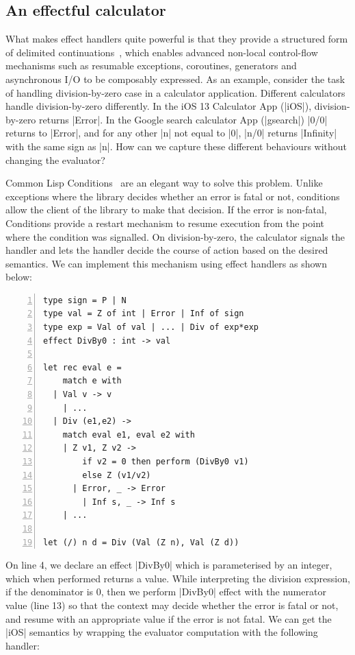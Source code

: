 \documentclass[sigplan,10pt,review,anonymous]{acmart}\settopmatter{printfolios=true,printccs=false,printacmref=false}
\begin{document}
\subsection{An effectful calculator}

What makes effect handlers quite powerful is that they provide a structured
form of delimited continuations~\cite{}, which enables advanced non-local
control-flow mechanisms such as resumable exceptions, coroutines, generators
and asynchronous I/O to be composably expressed. As an example, consider the
task of handling division-by-zero case in a calculator application. Different
calculators handle division-by-zero differently. In the iOS 13 Calculator App
(|iOS|), division-by-zero returns |Error|. In the Google search calculator App
(|gsearch|) |0/0| returns to |Error|, and for any other |n| not equal to |0|,
|n/0| returns |Infinity| with the same sign as |n|. How can we capture these
different behaviours without changing the evaluator?

Common Lisp Conditions~\cite{Conditions} are an elegant way to solve this
problem. Unlike exceptions where the library decides whether an error is fatal
or not, conditions allow the client of the library to make that decision. If
the error is non-fatal, Conditions provide a restart mechanism to
resume execution from the point where the condition was signalled. On
division-by-zero, the calculator signals the handler and lets the handler
decide the course of action based on the desired semantics. We can implement
this mechanism using effect handlers as shown below:

\begin{lstlisting}[numbers=left]
type sign = P | N
type val = Z of int | Error | Inf of sign
type exp = Val of val | ... | Div of exp*exp
effect DivBy0 : int -> val

let rec eval e =
	match e with
  | Val v -> v
	| ...
  | Div (e1,e2) ->
    match eval e1, eval e2 with
    | Z v1, Z v2 ->
        if v2 = 0 then perform (DivBy0 v1)
        else Z (v1/v2)
	  | Error, _ -> Error
		| Inf s, _ -> Inf s
  	| ...

let (/) n d = Div (Val (Z n), Val (Z d))
\end{lstlisting}

On line 4, we declare an effect |DivBy0| which is parameterised by an integer,
which when performed returns a value. While interpreting the division
expression, if the denominator is 0, then we perform |DivBy0| effect with the
numerator value (line 13) so that the context may decide whether the error is
fatal or not, and resume with an appropriate value if the error is not fatal.
We can get the |iOS| semantics by wrapping the evaluator computation with the
following handler:
\end{document}
